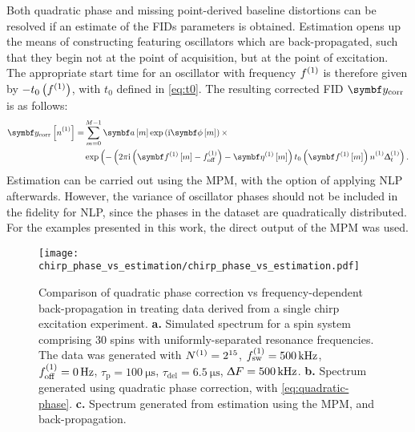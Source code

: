 Both quadratic phase and missing point-derived baseline distortions can be
resolved if an estimate of the \acp{FID} parameters is obtained. Estimation
opens up the means of constructing  featuring oscillators which
are back-propagated, such that they begin not at the point of acquisition, but
at the point of excitation. The appropriate start time for an oscillator with
frequency $f^{(1)}$ is therefore given by $-t_0\left( f^{(1)} \right)$, with  $t_0$
defined in \eqref{eq:t0}. The resulting corrected \ac{FID} $\by_{\text{corr}}$
is as follows:
\begin{equation}
    \begin{split}
        \by_{\text{corr}} \left[ \none \right] =
            &\sum_{m=0}^{M-1} \bdam \exp \left( \iu \bdphim \right) \times \\
            &\exp\left(-
            \left(2 \pi \iu \left(\bdfonem - \foffone \right) - \bdetaonem \right)
            t_0 \left(\bdfonem\right) \none \Dtone
            \right).
    \end{split}
\end{equation}
Estimation can be carried out using the \ac{MPM}, with the option of applying
\ac{NLP} afterwards. However, the variance of oscillator phases should not be
included in the fidelity for \ac{NLP}, since the phases in the dataset are
quadratically distributed. For the examples presented in this work, the direct
output of the \ac{MPM} was used.

\begin{figure}
    \centering
    \texttt{[image: chirp\_phase\_vs\_estimation/chirp\_phase\_vs\_estimation.pdf]}
    \caption[
        Comparison of quadratic phase correction vs frequency-dependent
        back-propagation in treating data derived from a single-chirp
        excitation experiment.
    ]
    {
        Comparison of quadratic phase correction vs frequency-dependent
        back-propagation in treating data derived from a single chirp
        excitation experiment.
        \textbf{a.} Simulated spectrum for a spin system comprising 30 spins
        with uniformly-separated resonance frequencies. The data was generated
        with
        $N^{(1)}=2^{15}$,
        $f_{\mathrm{sw}}^{(1)}=\qty{500}{\kilo\hertz}$,
        $f_{\mathrm{off}}^{(1)}=\qty{0}{\hertz}$,
        $\tau_{\text{p}} = \qty{100}{\micro\second}$,
        $\tau_{\text{del}} = \qty{6.5}{\micro\second}$,
        $\Updelta F = \qty{500}{\kilo\hertz}$.
        \textbf{b.} Spectrum generated using quadratic phase correction, with
        \eqref{eq:quadratic-phase}.
        \textbf{c.} Spectrum generated from estimation using the \ac{MPM}, and
        back-propagation.
    }
    \label{fig:chirp-phase-vs-backprop}
\end{figure}
